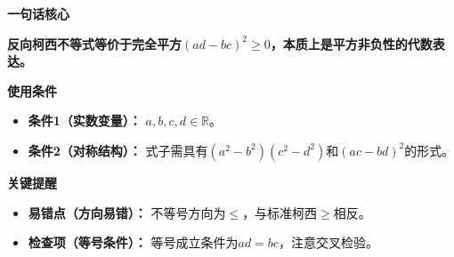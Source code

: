 \begin{summarybox}
	\textbf{\textcolor{CSummary}{一句话核心}}

	\textbf{反向柯西不等式等价于完全平方$(ad-bc)^2\ge0$，本质上是平方非负性的代数表达。}

	\medskip
	\textbf{\textcolor{CSummary}{使用条件}}
	\begin{itemize}[leftmargin=*, itemsep=0.5em, topsep=0.4em]
		\item \textbf{条件1（实数变量）：} $a,b,c,d\in\mathbb{R}$。
		\item \textbf{条件2（对称结构）：} 式子需具有$(a^2-b^2)(c^2-d^2)$和$(ac-bd)^2$的形式。
	\end{itemize}

	\medskip
	\textbf{\textcolor{CSummary}{关键提醒}}
	\begin{itemize}[leftmargin=*, itemsep=0.5em, topsep=0.4em]
		\item \textbf{易错点（方向易错）：} 不等号方向为$\le$，与标准柯西$\ge$相反。
		\item \textbf{检查项（等号条件）：} 等号成立条件为$ad=bc$，注意交叉检验。
	\end{itemize}
\end{summarybox}
